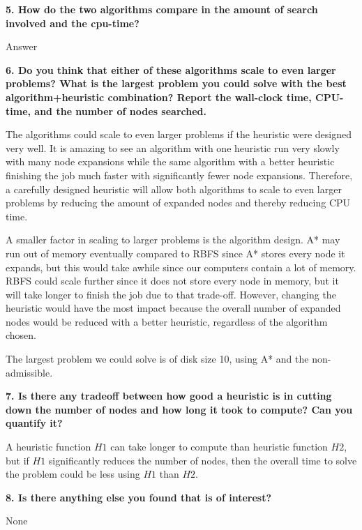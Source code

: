 \textbf{5. How do the two algorithms compare in the amount of search involved and the cpu-time?}

Answer

\textbf{6. Do you think that either of these algorithms scale to even larger problems? What is the largest problem you could solve with the best algorithm+heuristic combination? Report the wall-clock time, CPU-time, and the number of nodes searched.}

The algorithms could scale to even larger problems if the heuristic were designed very well. It is amazing to see an algorithm with one heuristic run very slowly with many node expansions while the same algorithm with a better heuristic finishing the job much faster with significantly fewer node expansions. Therefore, a carefully designed heuristic will allow both algorithms to scale to even larger problems by reducing the amount of expanded nodes and thereby reducing CPU time.

A smaller factor in scaling to larger problems is the algorithm design. A* may run out of memory eventually compared to RBFS since A* stores every node it expands, but this would take awhile since our computers contain a lot of memory. RBFS could scale further since it does not store every node in memory, but it will take longer to finish the job due to that trade-off. However, changing the heuristic would have the most impact because the overall number of expanded nodes would be reduced with a better heuristic, regardless of the algorithm chosen.

The largest problem we could solve is of disk size 10, using A* and the non-admissible.

\textbf{7. Is there any tradeoff between how good a heuristic is in cutting down the number of nodes and how long it took to compute? Can you quantify it?}

A heuristic function $H1$ can take longer to compute than heuristic function $H2$, but if $H1$ significantly reduces the number of nodes, then the overall time to solve the problem could be less using $H1$ than $H2$.

\textbf{8. Is there anything else you found that is of interest?}

None
